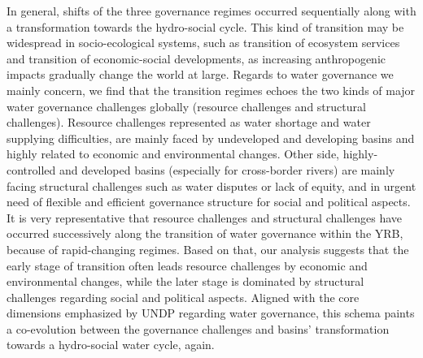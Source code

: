 \documentclass[9pt, twocolumn, twoside, lineno]{pnas-new}
\begin{document}
In general, shifts of the three governance regimes occurred sequentially along with a transformation towards the hydro-social cycle.
This kind of transition may be widespread in socio-ecological systems, such as transition of ecosystem services and transition of economic-social developments, as increasing anthropogenic impacts gradually change the world at large.
Regards to water governance we mainly concern, we find that the transition regimes echoes the two kinds of major water governance challenges globally (resource challenges and structural challenges).
Resource challenges represented as water shortage and water supplying difficulties, are mainly faced by undeveloped and developing basins and highly related to economic and environmental changes. 
Other side, highly-controlled and developed basins (especially for cross-border rivers) are mainly facing structural challenges such as water disputes or lack of equity, and in urgent need of flexible and efficient governance structure for social and political aspects.
It is very representative that resource challenges and structural challenges have occurred successively along the transition of water governance within the YRB, because of rapid-changing regimes.
Based on that, our analysis suggests that the early stage of transition often leads resource challenges by economic and environmental changes, while the later stage is dominated by structural challenges regarding social and political aspects.
Aligned with the core dimensions emphasized by UNDP regarding water governance, this schema paints a co-evolution between the governance challenges and basins' transformation towards a hydro-social water cycle, again. 
\end{document}
